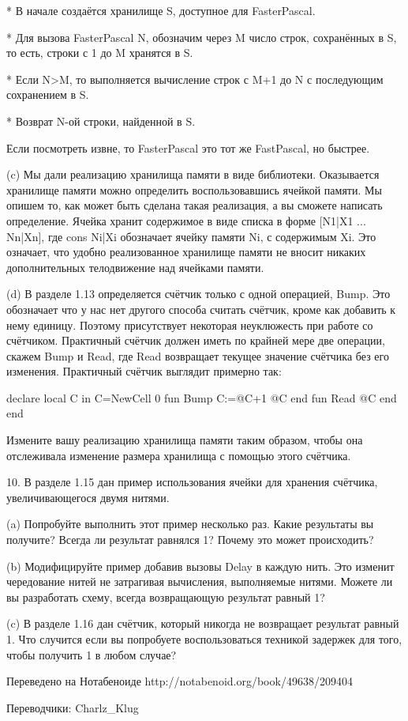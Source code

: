 * В начале создаётся хранилище S, доступное для FasterPascal.

* Для вызова {FasterPascal N}, обозначим через M число строк, сохранённых в S, то есть, строки с 1 до M хранятся в S.

* Если N>M, то выполняется вычисление строк с M+1 до N с последующим сохранением в S.

* Возврат N-ой строки, найденной в S.

Если посмотреть извне, то FasterPascal это тот же FastPascal, но быстрее.

(c) Мы дали реализацию хранилища памяти в виде библиотеки. Оказывается хранилище памяти можно определить воспользовавшись ячейкой памяти. Мы опишем то, как может быть сделана такая реализация, а вы сможете написать определение. Ячейка хранит содержимое в виде списка в форме [N1|X1 ... Nn|Xn], где cons Ni|Xi обозначает ячейку памяти Ni, с содержимым Xi. Это означает, что удобно реализованное хранилище памяти не вносит никаких дополнительных телодвижение над ячейками памяти.

(d) В разделе 1.13 определяется счётчик только с одной операцией, Bump. Это обозначает что у нас нет другого способа считать счётчик, кроме как добавить к нему единицу. Поэтому присутствует некоторая неуклюжесть при работе со счётчиком. Практичный счётчик должен иметь по крайней мере две операции, скажем Bump и Read, где Read возвращает текущее значение счётчика без его изменения. Практичный счётчик выглядит примерно так:

declare
local C in
C={NewCell 0}
fun {Bump}
C:=@C+1
@C
end
fun {Read}
@C
end
end

Измените вашу реализацию хранилища памяти таким образом, чтобы она отслеживала изменение размера хранилища с помощью этого счётчика.

10. В разделе 1.15 дан пример использования ячейки для хранения счётчика, увеличивающегося двумя нитями.

(a) Попробуйте выполнить этот пример несколько раз. Какие результаты вы получите? Всегда ли результат равнялся 1? Почему это может происходить?

(b) Модифицируйте пример добавив вызовы Delay в каждую нить. Это изменит чередование нитей не затрагивая вычисления, выполняемые нитями. Можете ли вы разработать схему, всегда возвращающую результат равный 1?

(c) В разделе 1.16 дан счётчик, который никогда не возвращает результат равный 1. Что случится если вы попробуете воспользоваться техникой задержек для того, чтобы получить 1 в любом случае?

Переведено на Нотабеноиде
http://notabenoid.org/book/49638/209404

Переводчики: Charlz\_Klug

